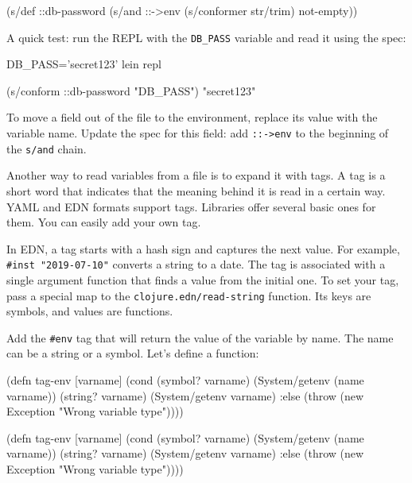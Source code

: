 \begin{clojure}
(s/def ::db-password
  (s/and ::->env
         (s/conformer str/trim)
         not-empty))
\end{clojure}

A quick test: run the REPL with the \verb|DB_PASS| variable and read it using the spec:

\begin{bash}
DB_PASS='secret123' lein repl

(s/conform ::db-password "DB_PASS")
"secret123"
\end{bash}

To move a field out of the file to the environment, replace its value with the variable name. Update the spec for this field: add \verb|::->env| to the beginning of the \verb|s/and| chain.


Another way to read variables from a file is to expand it with tags. A tag is a short word that indicates that the meaning behind it is read in a certain way. YAML and EDN formats support tags. Libraries offer several basic ones for them. You can easily add your own tag.


In EDN, a tag starts with a hash sign and captures the next value. For example, \verb|#inst "2019-07-10"| converts a string to a date. The tag is associated with a single argument function that finds a value from the initial one. To set your tag, pass a special map to the \verb|clojure.edn/read-string| function. Its keys are symbols, and values are functions.

Add the \verb|#env| tag that will return the value of the variable by name. The name can be a string or a symbol. Let's define a function:

\label{tag-env}

\ifnarrow

\begin{clojure}
(defn tag-env
  [varname]
  (cond
    (symbol? varname)
    (System/getenv (name varname))
    (string? varname)
    (System/getenv varname)
    :else
    (throw
      (new Exception
        "Wrong variable type"))))
\end{clojure}

\else

\begin{clojure}
(defn tag-env
  [varname]
  (cond
    (symbol? varname)
    (System/getenv (name varname))
    (string? varname)
    (System/getenv varname)
    :else
    (throw (new Exception "Wrong variable type"))))
\end{clojure}

